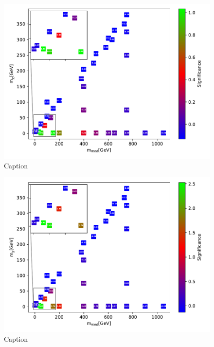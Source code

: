 \begin{figure}
    \centering
    \includegraphics[width = \textwidth]{Figures/Significances/significance_NN_monoZ_Low_level.pdf}
    \caption{Caption}
    \label{fig:my_label}
\end{figure}


\begin{figure}
    \centering
    \includegraphics[width = \textwidth]{Figures/Significances/significance_NN_monoZ_High_level.pdf}
    \caption{Caption}
    \label{fig:my_label}
\end{figure}















